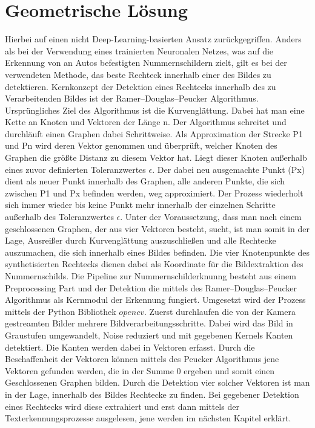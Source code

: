 \section{Geometrische Lösung}
Hierbei auf einen nicht Deep-Learning-basierten Ansatz zurückgegriffen. Anders als bei der Verwendung eines trainierten Neuronalen Netzes, was auf die Erkennung von an Autos befestigten Nummernschildern zielt, gilt es bei der verwendeten Methode, das beste Rechteck innerhalb einer des Bildes zu detektieren.
Kernkonzept der Detektion eines Rechtecks innerhalb des zu Verarbeitenden Bildes ist der Ramer–Douglas–Peucker Algorithmus. Ursprüngliches Ziel des Algorithmus ist die Kurvenglättung. Dabei hat man eine Kette an Knoten und Vektoren der Länge n. Der Algorithmus schreitet und durchläuft einen Graphen dabei Schrittweise. Als Approximation der Strecke P1 und Pn wird deren Vektor genommen und überprüft, welcher Knoten des Graphen die größte Distanz zu diesem Vektor hat. Liegt dieser Knoten außerhalb eines zuvor definierten Toleranzwertes $\epsilon$. %
Der dabei neu ausgemachte Punkt (Px) dient als neuer Punkt innerhalb des Graphen, alle anderen Punkte, die sich zwischen P1 und Px befinden werden, weg approximiert. Der Prozess wiederholt sich immer wieder bis keine Punkt mehr innerhalb der einzelnen Schritte außerhalb des Toleranzwertes $\epsilon$.\autocite[Vgl.][]{hershberger1992speeding} 
Unter der Voraussetzung, dass man nach einem geschlossenen Graphen, der aus vier Vektoren besteht, sucht, ist man somit in der Lage, Ausreißer durch Kurvenglättung auszuschließen und alle Rechtecke auszumachen, die sich innerhalb eines Bildes befinden. Die vier Knotenpunkte des synthetisierten Rechtecks dienen dabei als Koordinate für die Bildextraktion des Nummernschilds. %
Die Pipeline zur Nummernschilderknunng besteht aus einem Preprocessing Part und der Detektion die mittels des Ramer–Douglas–Peucker Algorithmus als Kernmodul der Erkennung fungiert. Umgesetzt wird der Prozess mittels der Python Bibliothek $opencv$. Zuerst durchlaufen die von der Kamera gestreamten Bilder mehrere Bildverarbeitungsschritte. Dabei wird das Bild in Graustufen umgewandelt, Noise reduziert und  mit gegebenen Kernels Kanten detektiert. %
 Die Kanten werden dabei in Vektoren erfasst. Durch die Beschaffenheit der Vektoren können mittels des Peucker Algorithmus jene Vektoren gefunden werden, die in der Summe 0 ergeben und somit einen Geschlossenen Graphen bilden. Durch die Detektion vier solcher Vektoren ist man in der Lage, innerhalb des Bildes Rechtecke zu finden. Bei gegebener Detektion eines Rechtecks wird diese extrahiert und erst dann mittels der Texterkennungsprozesse ausgelesen, jene werden im nächsten Kapitel erklärt. 








